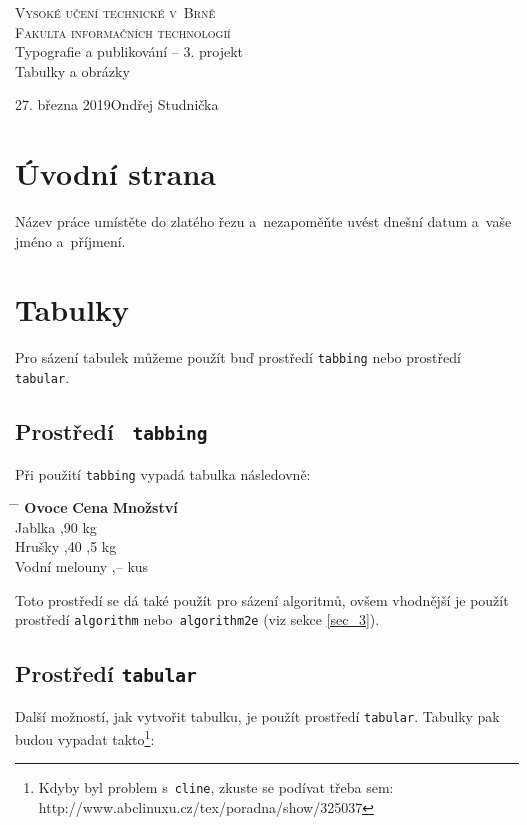 \documentclass[a4paper,11pt]{article}
\begin{document}
\begin{titlepage}
\begin{center}
\Huge
\textsc{Vysoké učení technické v~Brně}\\ \huge \textsc{Fakulta informačních technologií\\}
\LARGE
Typografie a publikování -- 3. projekt \\
\Huge
Tabulky a obrázky
\end{center} 
{\Large 27. března 2019\hfill Ondřej Studnička}
\end{titlepage}

\section{Úvodní strana}
Název práce umístěte do zlatého řezu a~nezapoměňte uvést dnešní datum a~vaše jméno a~příjmení.

\section{Tabulky}
Pro sázení tabulek můžeme použít buď prostředí \texttt{tabbing} nebo prostředí \texttt{tabular}.

\subsection{Prostředí \texttt{ tabbing }}
Při použití \texttt{tabbing} vypadá tabulka následovně:
\smallskip
\begin{tabbing}
\hspace{2.7cm} \= \hspace{1.3cm} \= \kill
\textbf{Ovoce} \> \textbf{Cena} \> \textbf{Množství} \\
Jablka ,90  kg \\
Hrušky ,40 ,5 kg \\
Vodní melouny ,--  kus
\end{tabbing}
\bigskip \noindent Toto prostředí se dá také použít pro sázení algoritmů, ovšem vhodnější je použít prostředí \texttt{algorithm} nebo\texttt{ algorithm2e} (viz sekce \ref{sec_3}).

\subsection{Prostředí \texttt{tabular}}

Další možností, jak vytvořit tabulku, je použít prostředí \texttt{tabular}. Tabulky pak budou vypadat takto\footnote{Kdyby byl problem s~\texttt{cline}, zkuste se podívat třeba sem: http://www.abclinuxu.cz/tex/poradna/show/325037}:
\end{document}
